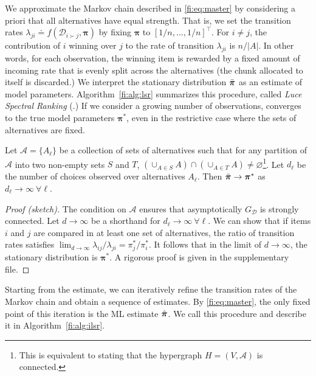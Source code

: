 We approximate the Markov chain described in \eqref{fi:eq:master} by considering a priori that all alternatives have equal strength.
That is, we set the transition rates $\lambda_{ji} \doteq f(\mathcal{D}_{i \succ j}, \bm{\pi})$ by fixing $\bm{\pi}$ to $[1/n, \ldots, 1/n]^\intercal$.
For $i \ne j$, the contribution of $i$ winning over $j$ to the rate of transition $\lambda_{ji}$ is $n / |A|$.
In other words, for each observation, the winning item is rewarded by a fixed amount of incoming rate that is evenly split across the alternatives (the chunk allocated to itself is discarded.)
We interpret the stationary distribution $\bar{\bm{\pi}}$ as an estimate of model parameters.
Algorithm~\ref{fi:alg:lsr} summarizes this procedure, called \emph{Luce Spectral Ranking} (\LSR{}.)
If we consider a growing number of observations, \LSR{} converges to the true model parameters $\bm{\pi}^*$, even in the restrictive case where the sets of alternatives are fixed.

\begin{theorem}
\label{fi:thm:consistency}
Let $\mathcal{A} = \{ A_\ell \}$ be a collection of sets of alternatives such that for any partition of $\mathcal{A}$ into two non-empty sets $S$ and $T$, $\left( \cup_{A \in S} A \right) \cap \left( \cup_{A \in T} A \right) \ne \varnothing$\footnote{
This is equivalent to stating that the hypergraph $H = (V, \mathcal{A})$ is connected.
}.
Let $d_\ell$ be the number of choices observed over alternatives $A_\ell$.
Then $\bar{\bm{\pi}} \to \bm{\pi}^*$ as $d_\ell \to \infty \ \forall \ell$.
\end{theorem}

\vspace{-0.3cm}
\begin{proof}[Proof (sketch)]
The condition on $\mathcal{A}$ ensures that asymptotically $G_{\mathcal{D}}$ is strongly connected.
Let $d \to \infty$ be a shorthand for $d_\ell \to \infty \ \forall \ell$.
We can show that if items $i$ and $j$ are compared in at least one set of alternatives, the ratio of transition rates satisfies $\lim_{d \to \infty} \lambda_{ij} / \lambda_{ji} = \pi^*_j / \pi^*_i$.
It follows that in the limit of $d \to \infty$, the stationary distribution is $\bm{\pi}^*$.
A rigorous proof is given in the supplementary file.
\end{proof}

Starting from the \LSR{} estimate, we can iteratively refine the transition rates of the Markov chain and obtain a sequence of estimates.
By \eqref{fi:eq:master}, the only fixed point of this iteration is the ML estimate $\hat{\bm{\pi}}$.
We call this procedure \ILSR{} and describe it in Algorithm~\ref{fi:alg:ilsr}.


